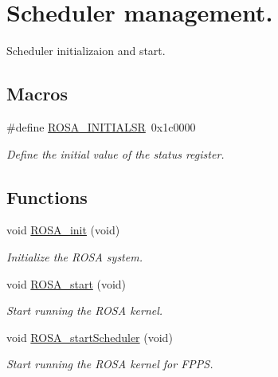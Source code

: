 \hypertarget{group__rosa__kernel__sm}{}\section{Scheduler management.}
\label{group__rosa__kernel__sm}


Scheduler initializaion and start.  


\subsection*{Macros}
\begin{DoxyCompactItemize}
\item 
\#define \mbox{\hyperlink{group__rosa__kernel__sm_gaf4c28a200166f46384b123c7be151e77}{R\+O\+S\+A\+\_\+\+I\+N\+I\+T\+I\+A\+L\+SR}}~0x1c0000
\begin{DoxyCompactList}\small\item\em Define the initial value of the status register. \end{DoxyCompactList}\end{DoxyCompactItemize}
\subsection*{Functions}
\begin{DoxyCompactItemize}
\item 
void \mbox{\hyperlink{group__rosa__kernel__sm_ga83eda3bb4fb3a94dea3894a596a662e6}{R\+O\+S\+A\+\_\+init}} (void)
\begin{DoxyCompactList}\small\item\em Initialize the R\+O\+SA system. \end{DoxyCompactList}\item 
void \mbox{\hyperlink{group__rosa__kernel__sm_ga299c2721dc32b54f2acb881cf98bc13d}{R\+O\+S\+A\+\_\+start}} (void)
\begin{DoxyCompactList}\small\item\em Start running the R\+O\+SA kernel. \end{DoxyCompactList}\item 
void \mbox{\hyperlink{group__rosa__kernel__sm_gaa7bf5f9ee0c2f711b8adeec7c816f44a}{R\+O\+S\+A\+\_\+start\+Scheduler}} (void)
\begin{DoxyCompactList}\small\item\em Start running the R\+O\+SA kernel for F\+P\+PS. \end{DoxyCompactList}\end{DoxyCompactItemize}


